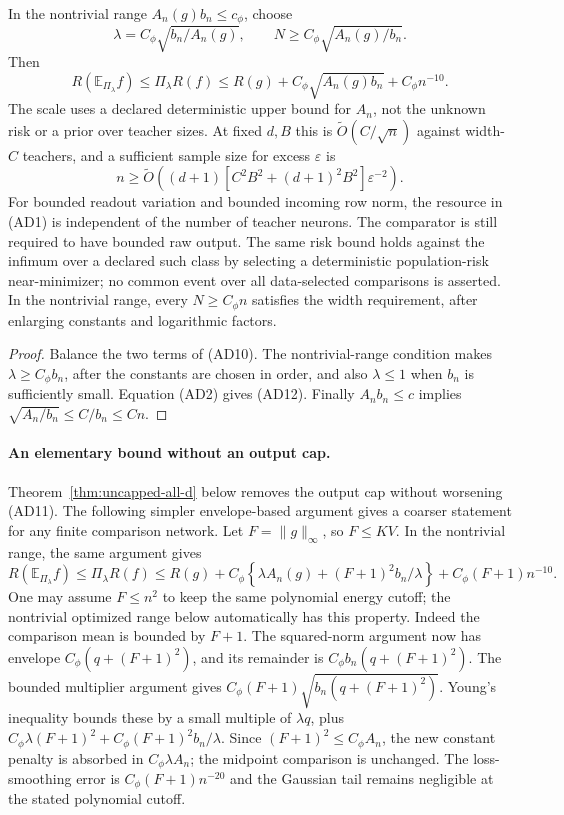 \begin{corollary}
\label{cor:all-d-sharp-polynomial}
In the nontrivial range $A_n(g)b_n\le c_\phi$, choose
\[
 \lambda=C_\phi\sqrt{b_n/A_n(g)},\qquad
 N\ge C_\phi\sqrt{A_n(g)/b_n}.
\]
Then
\[
 R(\mathbb E_{\Pi_\lambda}f)\le\Pi_\lambda R(f)
 \le R(g)+C_\phi\sqrt{A_n(g)b_n}+C_\phi n^{-10}.         \tag{AD11}
\]
The scale uses a declared deterministic upper bound for $A_n$, not the
unknown risk or a prior over teacher sizes. At fixed $d,B$ this is
$\widetilde O(C/\sqrt n)$ against width-$C$ teachers, and a sufficient
sample size for excess $\varepsilon$ is
\[
 n\ge\widetilde O\left(
 (d+1)[C^2B^2+(d+1)^2B^2]\varepsilon^{-2}\right).        \tag{AD12}
\]
For bounded readout variation and bounded incoming row norm, the resource
in (AD1) is independent of the number of teacher neurons. The comparator is still required to have
bounded raw output. The same risk bound holds against the infimum over
a declared such class by selecting a deterministic population-risk
near-minimizer; no common event over all data-selected comparisons is
asserted. In the nontrivial range, every $N\ge C_\phi n$ satisfies the
width requirement, after enlarging constants and logarithmic factors.
\end{corollary}
\begin{proof}
Balance the two terms of (AD10). The nontrivial-range condition makes
$\lambda\ge C_\phi b_n$, after the constants are chosen in order, and
also $\lambda\le1$ when $b_n$ is sufficiently small. Equation (AD2)
gives (AD12). Finally $A_nb_n\le c$ implies
$\sqrt{A_n/b_n}\le C/b_n\le Cn$.
\end{proof}

\paragraph{An elementary bound without an output cap.}
Theorem~\ref{thm:uncapped-all-d} below removes the output cap without
worsening (AD11). The following simpler envelope-based argument gives
a coarser statement for any finite comparison network.
Let $F=\|g\|_\infty$, so $F\le K V$. In the nontrivial range, the same
argument gives
\[
 R(\mathbb E_{\Pi_\lambda}f)\le\Pi_\lambda R(f)
 \le R(g)+C_\phi\left\{\lambda A_n(g)
             +(F+1)^2b_n/\lambda\right\}+C_\phi(F+1)n^{-10}.
                                                               \tag{AD13}
\]
One may assume $F\le n^2$ to keep the same polynomial energy cutoff;
the nontrivial optimized range below automatically has this property.
Indeed the comparison mean is bounded by $F+1$. The squared-norm
argument now has envelope $C_\phi(q+(F+1)^2)$, and its remainder is
$C_\phi b_n(q+(F+1)^2)$. The bounded multiplier argument gives
$C_\phi(F+1)\sqrt{b_n(q+(F+1)^2)}$. Young's inequality bounds these by
a small multiple of $\lambda q$, plus
$C_\phi\lambda(F+1)^2+C_\phi(F+1)^2b_n/\lambda$.
Since $(F+1)^2\le C_\phi A_n$, the new constant penalty is absorbed
in $C_\phi\lambda A_n$; the midpoint comparison is unchanged.
The loss-smoothing error is $C_\phi(F+1)n^{-20}$ and the Gaussian
tail remains negligible at the stated polynomial cutoff.

